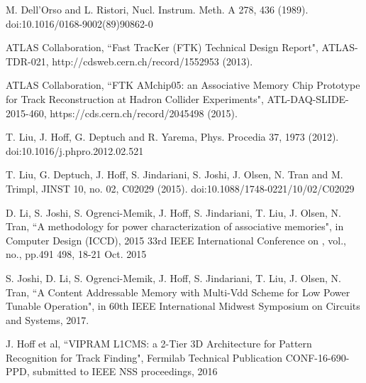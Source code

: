 \documentclass[letterpaper]{article}
\begin{document}
\begin{thebibliography}{77}
\small

 M. Dell’Orso and L. Ristori, Nucl. Instrum. Meth. A 278, 436 (1989).
doi:10.1016/0168-9002(89)90862-0

 ATLAS Collaboration, ``Fast TracKer (FTK) Technical Design Report", ATLAS-TDR-021, http://cdsweb.cern.ch/record/1552953 (2013).

 ATLAS Collaboration, ``FTK AMchip05: an Associative Memory Chip
Prototype for Track Reconstruction at Hadron Collider Experiments",
ATL-DAQ-SLIDE-2015-460, https://cds.cern.ch/record/2045498 (2015).

\bibitem{} T. Liu, J. Hoff, G. Deptuch and R. Yarema, Phys. Procedia 37, 1973 (2012). doi:10.1016/j.phpro.2012.02.521

 T. Liu, G. Deptuch, J. Hoff, S. Jindariani, S. Joshi, J. Olsen, N. Tran and M. Trimpl, JINST 10, no. 02, C02029 (2015). doi:10.1088/1748-0221/10/02/C02029

 D. Li, S. Joshi, S. Ogrenci-Memik, J. Hoff, S. Jindariani, T. Liu, J. Olsen, N. Tran, ``A methodology for power characterization of associative memories", in Computer Design (ICCD), 2015 33rd IEEE International Conference on , vol., no., pp.491 498, 18-21 Oct. 2015

 S. Joshi, D. Li, S. Ogrenci-Memik, J. Hoff, S. Jindariani, T. Liu, J. Olsen, 
N. Tran, ``A Content Addressable Memory with Multi-Vdd Scheme for Low Power Tunable Operation", in 60th IEEE International Midwest Symposium on Circuits and Systems, 2017.

 J. Hoff et al, ``VIPRAM L1CMS: a 2-Tier 3D Architecture for Pattern Recognition for Track Finding", Fermilab Technical Publication CONF-16-690-PPD, submitted to IEEE NSS proceedings, 2016

\end{thebibliography}
\end{document}

